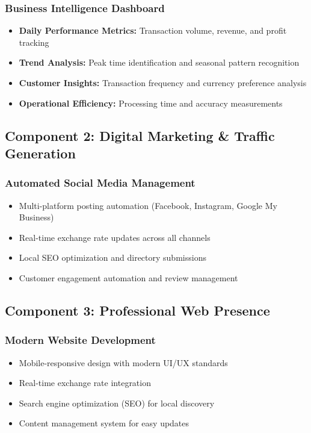 \documentclass[11pt, letterpaper]{article}
\begin{document}
\subsubsection{Business Intelligence Dashboard}

\begin{itemize}[leftmargin=*]
    \item \textbf{Daily Performance Metrics:} Transaction volume, revenue, and profit tracking
    \item \textbf{Trend Analysis:} Peak time identification and seasonal pattern recognition
    \item \textbf{Customer Insights:} Transaction frequency and currency preference analysis
    \item \textbf{Operational Efficiency:} Processing time and accuracy measurements
\end{itemize}

\subsection{Component 2: Digital Marketing \& Traffic Generation}

\subsubsection{Automated Social Media Management}
\begin{itemize}[leftmargin=*]
    \item Multi-platform posting automation (Facebook, Instagram, Google My Business)
    \item Real-time exchange rate updates across all channels
    \item Local SEO optimization and directory submissions
    \item Customer engagement automation and review management
\end{itemize}

\subsection{Component 3: Professional Web Presence}

\subsubsection{Modern Website Development}
\begin{itemize}[leftmargin=*]
    \item Mobile-responsive design with modern UI/UX standards
    \item Real-time exchange rate integration
    \item Search engine optimization (SEO) for local discovery
    \item Content management system for easy updates
\end{itemize}
\end{document}

